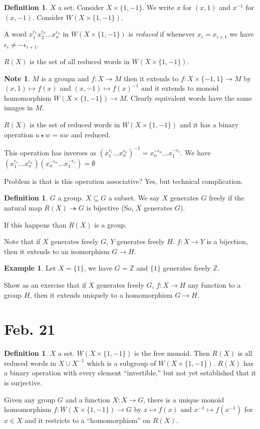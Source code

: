 \documentclass{amsart}
\theoremstyle{definition}
\newtheorem{definition}[thm]{Definition}
\newtheorem{example}[thm]{Example}
\newtheorem{note}[thm]{Note}
\newcommand{\Z}{\mathbb Z}
\begin{document}
\begin{definition}
	$X$ a set. Consider $X\times \{1,-1\}$. We write $x$  for $(x,1)$ and $x^{-1}$ for $(x,-1)$. Consider $W(X\times \{1,-1\})$.
	
	A word $x_1^{\epsilon_1}x_2^{\epsilon_2}...x_n^{\epsilon_n}$ in $W(X\times \{1,-1\})$ is \emph{reduced} if whenever $x_i=x_{i+1}$ we have $\epsilon_i\not=-\epsilon_{i+1}$.
	
	$R(X)$ is the set of all reduced words in $W(X\times \{1,-1\})$.
\end{definition}
\begin{note}
	$M$ is a groupa and $f:X\to M$ then it extends to $f:X\times \{-1,1\}\to M$ by $(x,1)\mapsto f(x)$ and $(x,-1)\mapsto f(x)^{-1}$ and it extends to monoid homomorphism $W(X\times \{1,-1\})\to M$. Clearly equivalent words have the same images in $M$. 

$R(X)$ is the set of reduced words in $W(X\times \{1,-1\})$ and it has a binary operation $u\star w=uw$ and reduced.

This operation has inverses as $(x_1^{\epsilon_1}...x_n^{\epsilon_n})^{-1}=x_n^{-\epsilon_n}...x_1^{-\epsilon_1}$. We have $(x_1^{\epsilon_1}...x_n^{\epsilon_n}) (x_n^{-\epsilon_n}...x_1^{-\epsilon_1})=\emptyset$	
\end{note}

Problem is that is this operation associative? Yes, but technical complication.

\begin{definition}
	$G$ a group. $X\subseteq G$ a subset. We say $X$ generates $G$ freely if the natural map $R(X)\twoheadrightarrow G$ is bijective (So, $X$ generates $G$).
	
	If this happens than $R(X)$ is a group.
\end{definition}
Note that if $X$ generates freely $G$, $Y$ generates
freely $H$. $f:X\to Y$ is a bijection, then it extends to an isomorphism $G\to H$.
\begin{example}
Let $X=\{1\}$, we have $G=\Z$ and $\{1\}$ generates freely $\Z$.	
\end{example}
Show as an exercise that if $X$ generates freely $G$, $f:X\to H$ any function to a group $H$, then it extends uniquely to a homomorphism $G\to H$.

\section{Feb. 21}
\begin{definition}
	$X$ a set. $W(X\times\{1,-1\})$ is the free monoid. Then $R(X)$ is all reduced words in $X\cup X^{-1}$ which is a subgroup of $W(X\times \{1,-1\})$. $R(X)$ has a binary operation with every element ``invertible,'' but not yet established that it is surjective.
\end{definition}
Given any group $G$ and a function $X:X\to G$, there is a unique monoid homomorphism $f:W(X\times\{1,-1\})\to G$ by $x\mapsto f(x)$ and $x^{-1}\mapsto f(x^{-1})$ for $x\in X$ and it restricts to a ``homomorphism'' on $R(X)$. 
\end{document}

